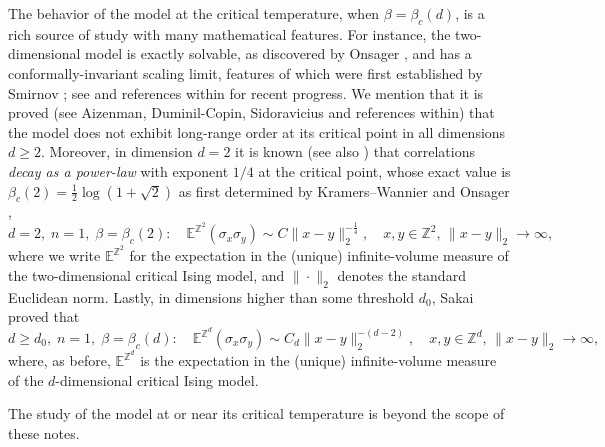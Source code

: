 \documentclass[12pt,reqno]{article}
\def\E{\mathbb{E}}
\def\Z{\mathbb{Z}}
\begin{document}
The behavior of the model at the critical temperature, when $\beta =
\beta_c(d)$, is a rich source of study with many mathematical
features. For instance, the two-dimensional model is exactly solvable, as discovered by Onsager \cite{Ons44}, and has a conformally-invariant scaling limit, features of which were first established by Smirnov \cite{Smi06, Smi10}; see \cite{CheSmi12, CheDumHon14, CHI15, benoist2016scaling} and references within for recent progress.
We mention that it is proved (see Aizenman, Duminil-Copin,
Sidoravicius \cite{AizDumSid15} and references within) that the
model does not exhibit long-range order at its critical point in all
dimensions $d\ge 2$. Moreover, in dimension $d=2$ it is known \cite{McCWu73, pinson2012rotational} (see also \cite{CHI15}) that
correlations \emph{decay as a power-law} with exponent $1/4$ at the critical point, whose exact value is $\beta_c(2)=\tfrac12 \log(1+\sqrt{2})$ as first determined by Kramers--Wannier \cite{KraWan41} and Onsager \cite{Ons44},
\begin{equation*}
  d=2,\; n=1,\; \beta=\beta_c(2)\colon\quad\E^{\Z^2}(\sigma_x \sigma_y) \sim C\|x-y\|_2^{-\frac{1}{4}},\quad\text{$x,y\in \Z^2$, $\|x-y\|_2\to\infty$},
\end{equation*}
where we write $\E^{\Z^2}$ for the expectation in the (unique) infinite-volume measure of the two-dimensional critical Ising model, and $\|\cdot\|_2$ denotes the standard Euclidean norm. Lastly, in dimensions higher than some threshold $d_0$, Sakai \cite{sakai2007lace} proved that
\begin{equation*}
  d\ge d_0,\; n=1,\; \beta=\beta_c(d)\colon\quad\E^{\Z^d}(\sigma_x \sigma_y) \sim C_d\|x-y\|_2^{-(d-2)},\quad\text{$x,y\in \Z^d$, $\|x-y\|_2\to\infty$},
\end{equation*}
where, as before, $\E^{\Z^d}$ is the expectation in the (unique) infinite-volume measure of the $d$-dimensional critical Ising model.

The study of the model at or near its critical temperature is beyond the scope of these notes.
\end{document}
